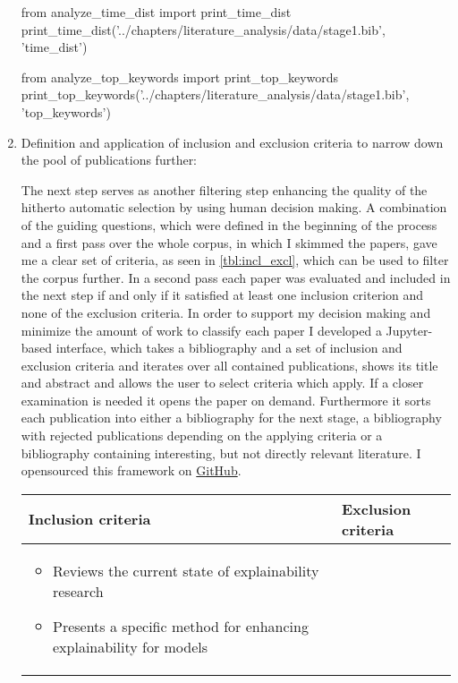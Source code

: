 \begin{enumerate}
\begin{pycode}
from analyze_time_dist import print_time_dist
print_time_dist('../chapters/literature_analysis/data/stage1.bib', 'time_dist')
\end{pycode}

\begin{pycode}
from analyze_top_keywords import print_top_keywords
print_top_keywords('../chapters/literature_analysis/data/stage1.bib', 'top_keywords')
\end{pycode}
	
	\item Definition and application of inclusion and exclusion criteria to narrow down the pool of publications further:
	
	The next step serves as another filtering step enhancing the quality of the hitherto automatic selection by using human decision making. A combination of the guiding questions, which were defined in the beginning of the process and a first pass over the whole corpus, in which I skimmed the papers, gave me a clear set of criteria, as seen in \autoref{tbl:incl_excl}, which can be used to filter the corpus further. In a second pass each paper was evaluated and included in the next step if and only if it satisfied at least one inclusion criterion and none of the exclusion criteria.	In order to support my decision making and minimize the amount of work to classify each paper I developed a Jupyter-based interface, which takes a bibliography and a set of inclusion and exclusion criteria and iterates over all contained publications, shows its title and abstract and allows the user to select criteria which apply. If a closer examination is needed it opens the paper on demand. Furthermore it sorts each publication into either a bibliography for the next stage, a bibliography with rejected publications depending on the applying criteria or a bibliography containing interesting, but not directly relevant literature. I opensourced this framework on \href{https://github.com/wittenator/limap}{GitHub}.
	
	\begin{table}
		\centering
		\begin{tabular}{  p{5cm} | p{5cm} }
			Inclusion criteria & Exclusion criteria  \\ \hline
			
			\begin{itemize}
				\item Reviews the current state of explainability research
				\item Presents a specific method for enhancing explainability for models
			\end{itemize}
			

\end{tabular}
\end{table}
\end{enumerate}
